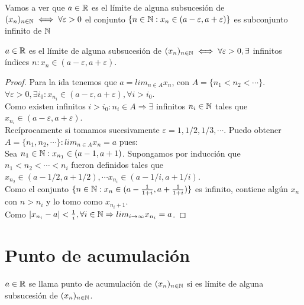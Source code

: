 Vamos a ver que $a \in \mathbb{R}$ es el límite de alguna subsucesión de $(x_n)_{n \in \mathbb{N}} \iff \forall \varepsilon > 0$ el conjunto $\{ n \in \mathbb{N} : x_n \in (a - \varepsilon, a + \varepsilon) \}$ es subconjunto infinito de $\mathbb{N}$ 
\begin{theorem}
  $a \in \mathbb{R}$ es el límite de alguna subsucesión de $(x_n)_{n \in \mathbb{N}} \iff \forall \varepsilon > 0, \exists$ infinitos índices $n : x_n \in (a-\varepsilon, a+\varepsilon)$.
  \begin{proof}
    Para la ida tenemos que $a = lim_{n \in A} x_n$, con $A = \{ n_1 < n_2 < \cdots \}$. \\
    $\forall \varepsilon > 0, \exists i_0 : x_{n_i} \in (a - \varepsilon, a + \varepsilon), \forall i > i_0$. \\
    Como existen infinitos $i > i_0 : n_i \in A \Rightarrow \exists$ infinitos $n_i \in \mathbb{N}$ tales que $x_{n_i} \in (a - \varepsilon, a + \varepsilon)$. \\

    Recíprocamente si tomamos sucesivamente $\varepsilon = 1, 1/2, 1/3, \cdots$. Puedo obtener $A = \{ n_1, n_2, \cdots \} : lim_{n \in A} x_n = a$ pues: \\
    Sea $n_1 \in \mathbb{N} : x_{n_1} \in (a-1, a+1)$. Supongamos por inducción que $n_1 < n_2 < \cdots < n_i$ fueron definidos tales que $x_{n_2} \in (a - 1/2, a + 1/2), \cdots x_{n_i} \in (a - 1/i, a + 1/i)$. \\
    Como el conjunto $\{ n \in \mathbb{N} : x_n \in (a - \frac{1}{1+i}, a + \frac{1}{1+i}) \}$ es infinito, contiene algún $x_n$ con $n > n_i$ y lo tomo como $x_{n_i + 1}$. \\
    Como $| x_{n_i} - a | < \frac{1}{i}, \forall i \in \mathbb{N} \Rightarrow lim_{i \to \infty} x_{n_i} = a$.
  \end{proof}
\end{theorem}

\section{Punto de acumulación}

\begin{definition}
  $a \in \mathbb{R}$ se llama punto de acumulación de $(x_n)_{n \in \mathbb{N}}$ si es límite de alguna subsucesión de $(x_n)_{n \in \mathbb{N}}$.
\end{definition}

